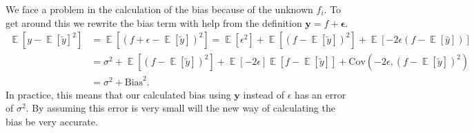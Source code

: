 \documentclass[11pt]{article}
\DeclareMathOperator*{\E}{\mathbb{E}}
\begin{document}
We face a problem in the calculation of the bias because of the unknown $f_i$. To get around this we rewrite the bias term with help from the definition $\boldsymbol{y} = f + \boldsymbol{\epsilon}$.
\begin{align*}
    \E[y - \E[\tilde{y}]^2] & = \E[(f+\epsilon - \E[\tilde{y}])^2] = \E[\epsilon^2] + \E[(f - \E[\tilde{y}])^2] + \E[-2\epsilon(f- \E[\hat{y}])]        \\
                            & = \sigma^2 + \E[(f - \E[\tilde{y}])^2] + \E[-2\epsilon]\E[f-\E[\tilde{y}]] + \text{Cov}(-2\epsilon, (f- \E[\tilde{y}])^2) \\
                            & = \sigma^2 + \text{Bias}^2.
\end{align*}
In practice, this means that our calculated bias using $\boldsymbol{y}$ instead of $\epsilon$ has an error of $\sigma^2$. By assuming this error is very small will the new way of calculating the bias be very accurate.
\end{document}
